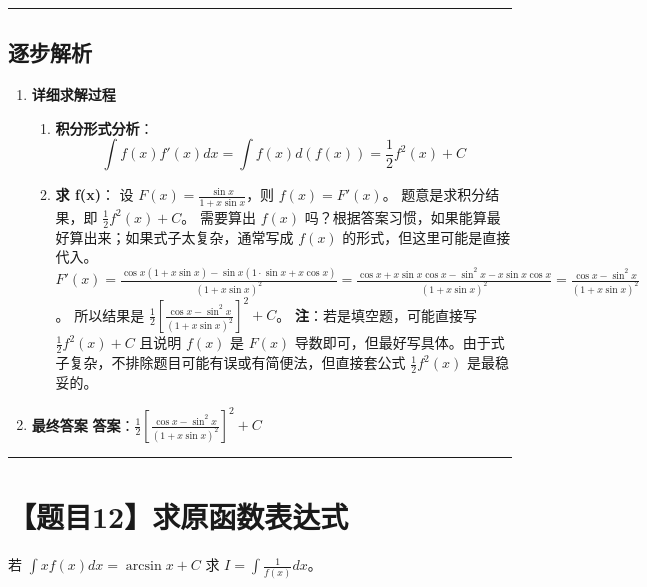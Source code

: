 \documentclass[UTF8]{ctexart}
\newenvironment{redenv}{\color{red}}{}
\newenvironment{detailedanalysis}{%
    \color{red}
    \begin{enumerate}[label=\textbf{第\arabic*步：}, leftmargin=*, align=left, itemsep=1.5ex]
}{%
    \end{enumerate}
}
\newcommand{\problemrule}{\noindent\rule{\textwidth}{1.5pt}\vspace{-0.8em}}
\newcommand{\analysisrule}{\noindent\rule{\textwidth}{0.8pt}\vspace{-0.8em}}
\begin{document}
\begin{redenv}
\analysisrule
\subsection*{逐步解析}

\begin{detailedanalysis}
\item \textbf{详细求解过程}
\begin{enumerate}[label=(\arabic*)]
\item \textbf{积分形式分析}：
$$ \int f(x) f'(x) dx = \int f(x) d(f(x)) = \frac{1}{2} f^2(x) + C $$
\item \textbf{求 f(x)}：
设 $F(x) = \frac{\sin x}{1 + x \sin x}$，则 $f(x) = F'(x)$。
题意是求积分结果，即 $\frac{1}{2}f^2(x)+C$。
需要算出 $f(x)$ 吗？根据答案习惯，如果能算最好算出来；如果式子太复杂，通常写成 $f(x)$ 的形式，但这里可能是直接代入。
$F'(x) = \frac{\cos x(1+x\sin x) - \sin x(1 \cdot \sin x + x\cos x)}{(1+x\sin x)^2} = \frac{\cos x + x\sin x \cos x - \sin^2 x - x\sin x \cos x}{(1+x\sin x)^2} = \frac{\cos x - \sin^2 x}{(1+x\sin x)^2}$。
所以结果是 $\frac{1}{2} \left[ \frac{\cos x - \sin^2 x}{(1+x\sin x)^2} \right]^2 + C$。
\textbf{注}：若是填空题，可能直接写 $\frac{1}{2}f^2(x)+C$ 且说明 $f(x)$ 是 $F(x)$ 导数即可，但最好写具体。由于式子复杂，不排除题目可能有误或有简便法，但直接套公式 $\frac{1}{2}f^2(x)$ 是最稳妥的。
\end{enumerate}

\item \textbf{最终答案}
\textbf{答案}：$ \frac{1}{2} \left[ \frac{\cos x - \sin^2 x}{(1+x\sin x)^2} \right]^2 + C $
\end{detailedanalysis}
\end{redenv}

\problemrule
\section*{【题目12】求原函数表达式}
若 $ \int xf(x)dx = \arcsin x + C $ 求 $ I = \int \frac{1}{f(x)}dx $。
\end{document}
